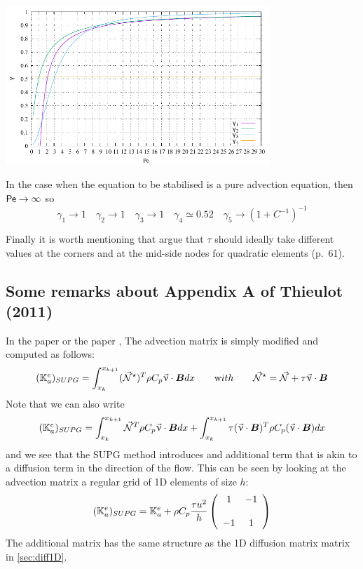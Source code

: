 \begin{center}
\includegraphics[width=10cm]{images/supg/gamma} 
\end{center}

In the case when the equation to be stabilised is a pure advection equation, 
then ${\mathsf{Pe}}\rightarrow \infty$ so 
\[
\gamma_1 \rightarrow 1  \quad
\gamma_2 \rightarrow 1 \quad
\gamma_3 \rightarrow 1 \quad
\gamma_4 \simeq 0.52 \quad
\gamma_5 \rightarrow (1+C^{-1})^{-1} 
\]

Finally it is worth mentioning that \textcite{dohu03} argue that $\tau$ should 
ideally take different values at the corners and at the mid-side nodes for quadratic elements (p.~61).

\subsection{Some remarks about Appendix A of Thieulot (2011) \cite{thie11}}
\label{ss:appAthie11}

In the \douar paper \cite{brtf08} or the \fantom paper \cite{thie11},
The advection matrix is simply modified and computed as follows:
\[
({{\mathbb{K}}}_a^e)_{SUPG}
=
\int_{x_k}^{x_{k+1}}   ({\vec {{\mathcal{N}}}}^\star)^T \rho C_p \vec\upnu \cdot {\bm B} dx  
\quad\quad
{\text with}
\quad\quad
{\vec {{\mathcal{N}}}}^\star= {\vec {{\mathcal{N}}}} + \tau \vec \upnu \cdot {\bm B}
\]
Note that we can also write 
\[
({{\mathbb{K}}}_a^e)_{SUPG}
=
\int_{x_k}^{x_{k+1}}   {\vec {{\mathcal{N}}}}^T \rho C_p \vec\upnu \cdot {\bm B} dx  
+
\int_{x_k}^{x_{k+1}}  \tau (\vec \upnu \cdot {\bm B})^T   \rho C_p (\vec\upnu \cdot {\bm B}) dx  
\]
and we see that the SUPG method introduces and additional term that is akin to 
a diffusion term in the direction of the flow.
This can be seen by looking at the advection matrix a regular grid of 1D 
elements of size $h$:
\[
({{\mathbb{K}}}_a^e)_{SUPG}=
{{\mathbb{K}}}_a^e
+
\rho C_p
\frac{\tau u^2}{h}
\left(
\begin{array}{cc}
1 & -1 \\ \\
-1 & 1
\end{array}
\right)
\]
The additional matrix has the same structure as the 1D diffusion matrix matrix in \ref{sec:diff1D}.

